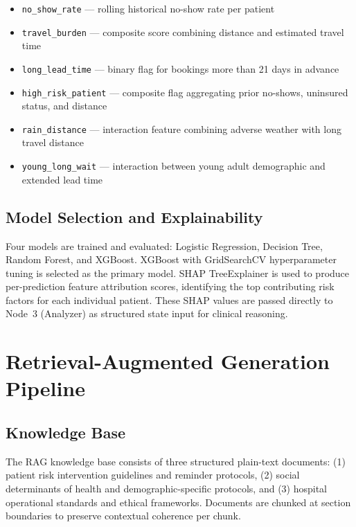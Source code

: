 \documentclass[12pt, a4paper]{report}
\begin{document}
\begin{itemize}
  \item \texttt{no\_show\_rate} --- rolling historical no-show rate per patient
  \item \texttt{travel\_burden} --- composite score combining distance and estimated travel time
  \item \texttt{long\_lead\_time} --- binary flag for bookings more than 21 days in advance
  \item \texttt{high\_risk\_patient} --- composite flag aggregating prior no-shows, uninsured status, and distance
  \item \texttt{rain\_distance} --- interaction feature combining adverse weather with long travel distance
  \item \texttt{young\_long\_wait} --- interaction between young adult demographic and extended lead time
\end{itemize}

\subsection{Model Selection and Explainability}

Four models are trained and evaluated: Logistic Regression, Decision Tree, Random Forest, and XGBoost. XGBoost with GridSearchCV hyperparameter tuning is selected as the primary model. SHAP TreeExplainer is used to produce per-prediction feature attribution scores, identifying the top contributing risk factors for each individual patient. These SHAP values are passed directly to Node~3 (Analyzer) as structured state input for clinical reasoning.

\vspace{1.3cm}
\section{Retrieval-Augmented Generation Pipeline}

\subsection{Knowledge Base}

The RAG knowledge base consists of three structured plain-text documents: (1) patient risk intervention guidelines and reminder protocols, (2) social determinants of health and demographic-specific protocols, and (3) hospital operational standards and ethical frameworks. Documents are chunked at section boundaries to preserve contextual coherence per chunk.
\end{document}
